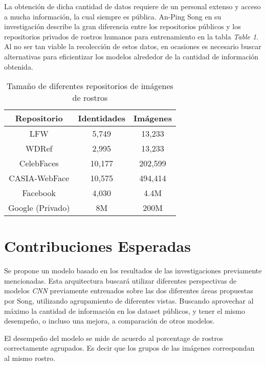 \documentclass[a4paper, 10pt, conference]{ieeeconf}      %
\begin{document}
    \newline
    La obtención de dicha cantidad de datos requiere de un personal extenso y acceso
    a mucha información, la cual siempre es pública. An-Ping Song en su
    investigación describe la gran diferencia entre los repositorios públicos y
    los repositorios privados de rostros humanos para entrenamiento en la
    tabla \textit{Table 1}. \cite{IECNN} Al no ser tan viable la recolección de
    estos datos, en ocasiones es necesario buscar alternativas para eficientizar
    los modelos alrededor de la cantidad de información obtenida.
    
    \begin{table}[ht]
        \caption{Tamaño de diferentes repositorios de imágenes de rostros}
        \label{t1}
        \begin{center}
            \begin{tabular}{|c||c||c|}
                \hline
                \textbf{Repositorio} & \textbf{Identidades} & \textbf{Imágenes} \\
                \hline
                LFW & 5,749 & 13,233 \\
                \hline
                WDRef & 2,995 & 13,233 \\
                \hline
                CelebFaces & 10,177 & 202,599 \\
                \hline
                CASIA-WebFace & 10,575 & 494,414 \\
                \hline
                Facebook & 4,030 & 4.4M \\
                \hline
                Google (Privado) & 8M & 200M \\
                \hline
            \end{tabular}
        \end{center}
    \end{table}

    \section{Contribuciones Esperadas}
    Se propone un modelo basado en los resultados de las investigaciones previamente
    mencionadas. Esta arquitectura buscará utilizar diferentes perspectivas de
    modelos \textit{CNN} previamente entrenados sobre las dos diferentes áreas
    propuestas por Song, utilizando agrupamiento de diferentes vistas. Buscando
    aprovechar al máximo la cantidad de información en los dataset públicos, y
    tener el mismo desempeño, o incluso una mejora, a comparación de otros modelos.

    \newline
    El desempeño del modelo se mide de acuerdo al porcentage de rostros correctamente
    agrupados. Es decir que los grupos de las imágenes correspondan al mismo rostro.

\end{document}
